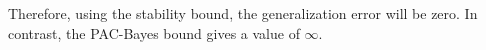 Therefore, using the stability bound, the generalization error will be zero. In contrast, the PAC-Bayes bound gives a value of \( \infty \).




